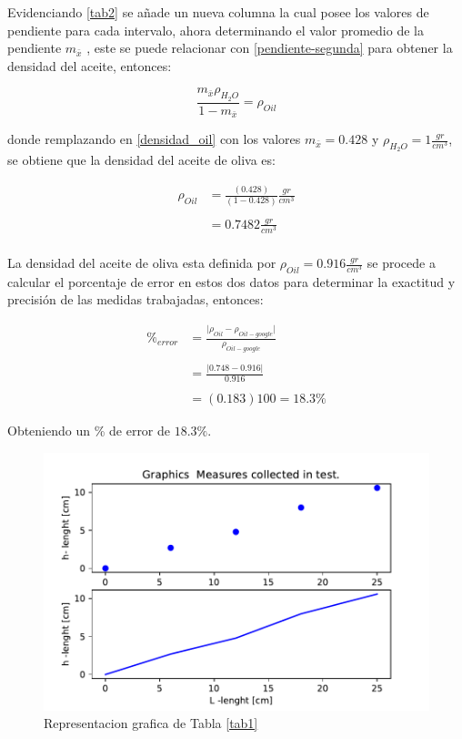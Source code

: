 Evidenciando \ref{tab2} se añade un nueva columna la cual posee los valores de pendiente para cada intervalo, ahora determinando el valor promedio de la pendiente $m_{\bar{x}}$ , este se puede relacionar con \ref{pendiente-segunda} para obtener la densidad del aceite, entonces:

\begin{equation}
    \label{densidad_oil}
    \frac{m_{\bar{x}}\rho_{H_{2}O}}{1-m_{\bar{x}}} = \rho_{Oil}
\end{equation}

donde remplazando en \ref{densidad_oil} con los valores $m_{\bar{x}}=0.428$ y $\rho_{H_{2}O} = 1 \frac{gr}{cm^3}$, se obtiene que la densidad del aceite de oliva es:

\begin{align*}
     \rho_{Oil} &= \frac{(0.428)}{(1-0.428)} \frac{gr}{cm^3}\\\\
     &= 0.7482 \frac{gr}{cm^3}\\
\end{align*}

La densidad del aceite de oliva esta definida por $\rho_{Oil} = 0.916 \frac{gr}{cm^3}$ \cite{density-oil} se procede a calcular el porcentaje de error en estos dos datos para determinar la exactitud y precisión de las medidas trabajadas, entonces:

\begin{align*}
    \%_{error} &= \frac{\lvert \rho_{Oil} - \rho_{Oil-google} \rvert}{\rho_{Oil-google}}\\\\
    &= \frac{\lvert 0.748 - 0.916 \rvert}{0.916}\\\\
    &= (0.183)100 = 18.3 \%
\end{align*}

Obteniendo un \% de error de $18.3\%$.

\begin{figure}[htbp]
  \begin{center}
  \includegraphics[scale=0.6]{pdf/plot-1-data-collected.pdf}
  \caption{Representacion grafica de Tabla \ref{tab1} }\label{measure-data-lab}
  \end{center}
\end{figure}

